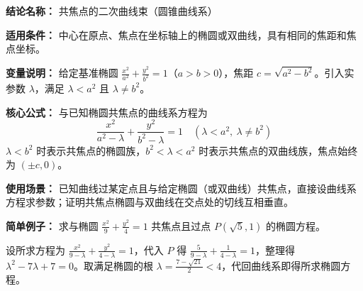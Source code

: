 \textbf{结论名称：} 共焦点的二次曲线束（圆锥曲线系）

\textbf{适用条件：} 中心在原点、焦点在坐标轴上的椭圆或双曲线，具有相同的焦距和焦点坐标。

\textbf{变量说明：} 给定基准椭圆 $\frac{x^2}{a^2}+\frac{y^2}{b^2}=1$（$a>b>0$），焦距 $c=\sqrt{a^2-b^2}$。引入实参数 $\lambda$，满足 $\lambda<a^2$ 且 $\lambda\neq b^2$。

\textbf{核心公式：} 与已知椭圆共焦点的曲线系方程为
\[
\boxed{\frac{x^2}{a^2-\lambda}+\frac{y^2}{b^2-\lambda}=1}\quad (\lambda<a^2,\ \lambda\neq b^2)
\]
$\lambda<b^2$ 时表示共焦点的椭圆族，$b^2<\lambda<a^2$ 时表示共焦点的双曲线族，焦点始终为 $(\pm c,0)$。

\textbf{使用场景：} 已知曲线过某定点且与给定椭圆（或双曲线）共焦点，直接设曲线系方程求参数；证明共焦点椭圆与双曲线在交点处的切线互相垂直。

\textbf{简单例子：} 求与椭圆 $\frac{x^2}{9}+\frac{y^2}{4}=1$ 共焦点且过点 $P(\sqrt{5},1)$ 的椭圆方程。

设所求方程为 $\frac{x^2}{9-\lambda}+\frac{y^2}{4-\lambda}=1$，代入 $P$ 得 $\frac{5}{9-\lambda}+\frac{1}{4-\lambda}=1$，整理得 $\lambda^2-7\lambda+7=0$。取满足椭圆的根 $\lambda=\frac{7-\sqrt{21}}{2}<4$，代回曲线系即得所求椭圆方程。